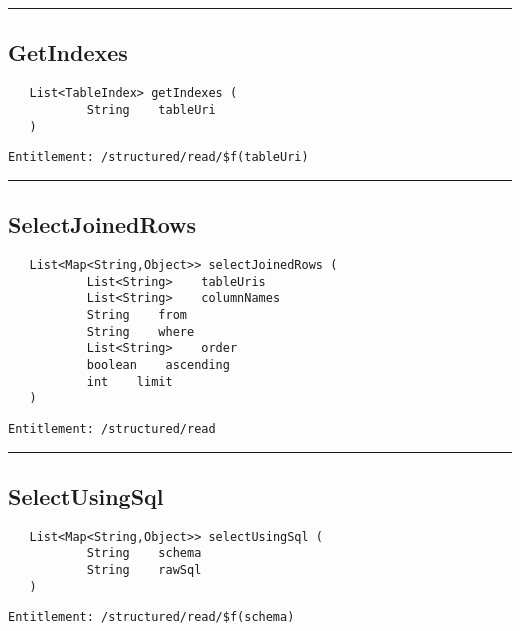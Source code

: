\rule{12cm}{2pt}
\subsection{GetIndexes}
\label{Api:GetIndexes}
\begin{verbatim}
   List<TableIndex> getIndexes (
           String    tableUri
   )
\end{verbatim}
\begin{Verbatim}[fontsize=\small, formatcom=\color{Maroon}]
  Entitlement: /structured/read/$f(tableUri)
\end{Verbatim}



\rule{12cm}{2pt}
\subsection{SelectJoinedRows}
\label{Api:SelectJoinedRows}
\begin{verbatim}
   List<Map<String,Object>> selectJoinedRows (
           List<String>    tableUris
           List<String>    columnNames
           String    from
           String    where
           List<String>    order
           boolean    ascending
           int    limit
   )
\end{verbatim}
\begin{Verbatim}[fontsize=\small, formatcom=\color{Maroon}]
  Entitlement: /structured/read
\end{Verbatim}



\rule{12cm}{2pt}
\subsection{SelectUsingSql}
\label{Api:SelectUsingSql}
\begin{verbatim}
   List<Map<String,Object>> selectUsingSql (
           String    schema
           String    rawSql
   )
\end{verbatim}
\begin{Verbatim}[fontsize=\small, formatcom=\color{Maroon}]
  Entitlement: /structured/read/$f(schema)
\end{Verbatim}



